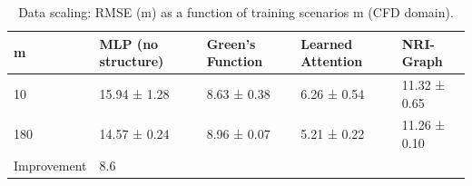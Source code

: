 \begin{table}
\caption{Data scaling: RMSE (m) as a function of training scenarios m (CFD domain).}
\label{tab:data-scaling}
\begin{tabular}{lllll}
\toprule
m & MLP (no structure) & Green's Function & Learned Attention & NRI-Graph \\
\midrule
10 & 15.94 ± 1.28 & 8.63 ± 0.38 & 6.26 ± 0.54 & 11.32 ± 0.65 \\
180 & 14.57 ± 0.24 & 8.96 ± 0.07 & 5.21 ± 0.22 & 11.26 ± 0.10 \\
Improvement & 8.6%
\bottomrule
\end{tabular}
\end{table}
